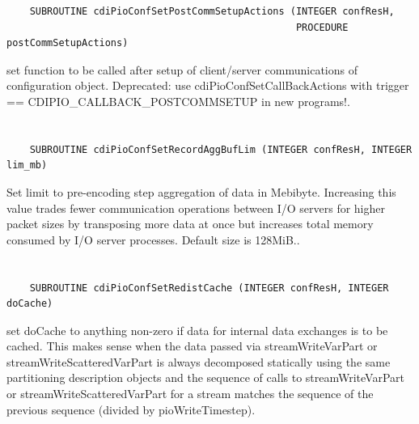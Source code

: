 \begin{verbatim}
    SUBROUTINE cdiPioConfSetPostCommSetupActions (INTEGER confResH,
                                                  PROCEDURE postCommSetupActions)
\end{verbatim}

set function to be called after
setup of client/server communications of configuration object.
Deprecated: use cdiPioConfSetCallBackActions with
trigger == CDIPIO_CALLBACK_POSTCOMMSETUP in new programs!.


\section*{\tt {}}

\begin{verbatim}
    SUBROUTINE cdiPioConfSetRecordAggBufLim (INTEGER confResH, INTEGER lim_mb)
\end{verbatim}

Set limit to pre-encoding step
aggregation of data in Mebibyte. Increasing this value trades fewer
communication operations between I/O servers for higher packet
sizes by transposing more data at once but increases total memory
consumed by I/O server processes.  Default size is 128MiB..


\section*{\tt {}}

\begin{verbatim}
    SUBROUTINE cdiPioConfSetRedistCache (INTEGER confResH, INTEGER doCache)
\end{verbatim}

set doCache to anything non-zero if data
for internal data exchanges is to be cached. This makes sense when
the data passed via streamWriteVarPart or streamWriteScatteredVarPart
is always decomposed statically using the same partitioning
description objects and the sequence of calls to streamWriteVarPart
or streamWriteScatteredVarPart for a stream matches the sequence
of the previous sequence (divided by pioWriteTimestep).


\section*{\tt {}}

